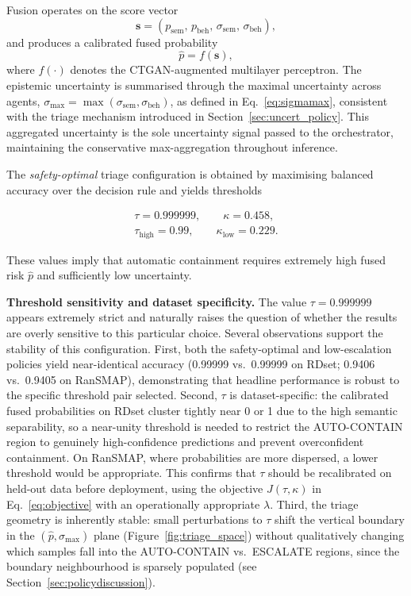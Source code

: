 \documentclass[lettersize,journal]{IEEEtran}
\begin{document}
Fusion operates on the score vector
\begin{equation}
\mathbf{s} = \left(p_{\mathrm{sem}},\, p_{\mathrm{beh}},\, \sigma_{\mathrm{sem}},\, \sigma_{\mathrm{beh}}\right),
\label{eq:scorevector}
\end{equation}
and produces a calibrated fused probability
\begin{equation}
\hat{p} = f(\mathbf{s}),
\label{eq:fusedp}
\end{equation}
where \(f(\cdot)\) denotes the CTGAN-augmented multilayer perceptron. The epistemic uncertainty is summarised through the maximal uncertainty across agents,
$\sigma_{\max} = \max(\sigma_{\mathrm{sem}}, \sigma_{\mathrm{beh}})$, as defined in
Eq.~\eqref{eq:sigmamax}, consistent with the triage mechanism introduced in
Section~\ref{sec:uncert_policy}. This aggregated uncertainty is the sole uncertainty signal
passed to the orchestrator, maintaining the conservative max-aggregation throughout inference.

The \emph{safety-optimal} triage configuration is obtained by maximising balanced accuracy over the decision rule and yields thresholds

\begin{gather}
\tau = 0.999999,\qquad  \kappa = 0.458, \\
\tau_{\mathrm{high}} = 0.99,\qquad \kappa_{\mathrm{low}} = 0.229.
\label{eq:policy_safety}
\end{gather}


These values imply that automatic containment requires extremely high fused risk \(\hat{p}\)
and sufficiently low uncertainty.

\noindent\textbf{Threshold sensitivity and dataset specificity.}
The value $\tau = 0.999999$ appears extremely strict and naturally raises the question of
whether the results are overly sensitive to this particular choice. Several observations
support the stability of this configuration. First, both the safety-optimal and
low-escalation policies yield near-identical accuracy (0.99999 vs.\ 0.99999 on RDset;
0.9406 vs.\ 0.9405 on RanSMAP), demonstrating that headline performance is robust to the
specific threshold pair selected. Second, $\tau$ is dataset-specific: the calibrated fused
probabilities on RDset cluster tightly near 0 or 1 due to the high semantic separability,
so a near-unity threshold is needed to restrict the AUTO-CONTAIN region to genuinely
high-confidence predictions and prevent overconfident containment. On RanSMAP, where
probabilities are more dispersed, a lower threshold would be appropriate. This confirms
that $\tau$ should be recalibrated on held-out data before deployment, using the objective
$J(\tau,\kappa)$ in Eq.~\eqref{eq:objective} with an operationally appropriate $\lambda$.
Third, the triage geometry is inherently stable: small perturbations to $\tau$ shift the
vertical boundary in the $(\hat{p}, \sigma_{\max})$ plane (Figure~\ref{fig:triage_space})
without qualitatively changing which samples fall into the AUTO-CONTAIN vs.\ ESCALATE
regions, since the boundary neighbourhood is sparsely populated (see Section~\ref{sec:policydiscussion}).
\end{document}
